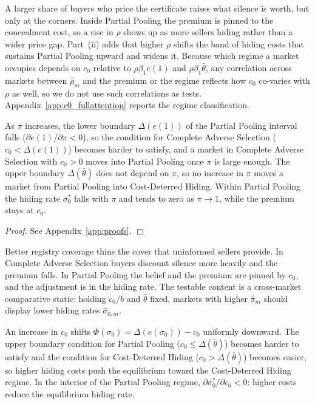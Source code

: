 \noindent A larger share of buyers who price the certificate raises what silence is worth, but
only at the corners. Inside Partial Pooling the premium is pinned to the concealment cost, so a
rise in $\rho$ shows up as more sellers hiding rather than a wider price gap. Part~(ii) adds that
higher $\rho$ shifts the band of hiding costs that sustains Partial Pooling upward and widens it.
Because which regime a market occupies depends on $c_0$ relative to $\rho\beta_1e(1)$ and
$\rho\beta_1\bar\theta$, any correlation across markets between $\hat\rho_m$ and the premium or the regime
reflects how $c_0$ co-varies with $\rho$ as well, so we do not use such correlations as tests.
Appendix~\ref{app:c0_fullattention} reports the regime classification.

\begin{proposition}
\label{prop:pi}
As $\pi$ increases, the lower boundary $\Delta(e(1))$ of the Partial Pooling interval falls ($\partial e(1)/\partial\pi < 0$), so the condition for Complete Adverse Selection ($c_0 < \Delta(e(1))$) becomes harder to satisfy, and a market in Complete Adverse Selection with $c_0>0$ moves into Partial Pooling once $\pi$ is large enough. The upper boundary $\Delta(\bar\theta)$ does not depend on $\pi$, so no increase in $\pi$ moves a market from Partial Pooling into Cost-Deterred Hiding. Within Partial Pooling the hiding rate $\sigma_0^*$ falls with $\pi$ and tends to zero as $\pi\to1$, while the premium stays at $c_0$.
\end{proposition}

\noindent\textit{Proof.} See Appendix~\ref{app:proofs}. $\Box$

\noindent Better registry coverage thins the cover that uninformed sellers provide. In Complete Adverse Selection buyers discount silence more heavily and the premium falls. In Partial Pooling the belief and the premium are pinned by $c_0$, and the adjustment is in the hiding rate. The testable content is a cross-market comparative static: holding $c_0/b$ and $\bar\theta$ fixed, markets with higher $\hat\pi_m$ should display lower hiding rates $\hat\sigma_{0,m}$.

\begin{proposition}
\label{prop:c0}
An increase in $c_0$ shifts $\Phi(\sigma_0) = \Delta(e(\sigma_0)) - c_0$ uniformly downward. The upper boundary condition for Partial Pooling ($c_0 \leq \Delta(\bar{\theta})$) becomes harder to satisfy and the condition for Cost-Deterred Hiding ($c_0 > \Delta(\bar{\theta})$) becomes easier, so higher hiding costs push the equilibrium toward the Cost-Deterred Hiding regime. In the interior of the Partial Pooling regime, $\partial\sigma_0^*/\partial c_0 < 0$: higher costs reduce the equilibrium hiding rate.
\end{proposition}

